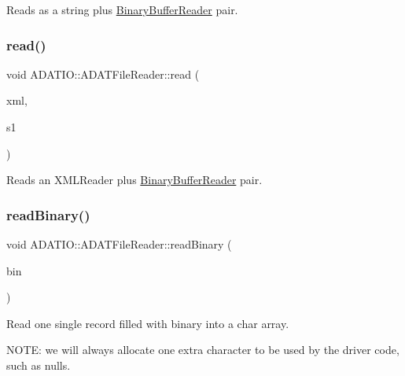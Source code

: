 Reads as a string plus \mbox{\hyperlink{classADATIO_1_1BinaryBufferReader}{Binary\+Buffer\+Reader}} pair. 

\mbox{\label{classADATIO_1_1ADATFileReader_gadf1e0b4405e14798a0610efd8774f8d0}} 
\subsubsection{\texorpdfstring{read()}{read()}\hspace{0.1cm}{\footnotesize\ttfamily [4/4]}}
{\footnotesize\ttfamily void A\+D\+A\+T\+I\+O\+::\+A\+D\+A\+T\+File\+Reader\+::read (\begin{DoxyParamCaption}\item[{\mbox{\hyperlink{classADATXML_1_1XMLReader}{X\+M\+L\+Reader}} \&}]{xml,  }\item[{\mbox{\hyperlink{classADATIO_1_1BinaryBufferReader}{Binary\+Buffer\+Reader}} \&}]{s1 }\end{DoxyParamCaption})}



Reads an X\+M\+L\+Reader plus \mbox{\hyperlink{classADATIO_1_1BinaryBufferReader}{Binary\+Buffer\+Reader}} pair. 

\mbox{\label{classADATIO_1_1ADATFileReader_ga40b41bda2b27ce68a0ac0ee28124fc64}} 
\subsubsection{\texorpdfstring{readBinary()}{readBinary()}}
{\footnotesize\ttfamily void A\+D\+A\+T\+I\+O\+::\+A\+D\+A\+T\+File\+Reader\+::read\+Binary (\begin{DoxyParamCaption}\item[{\mbox{\hyperlink{classXMLArray_1_1Array}{Array}}$<$ char $>$ \&}]{bin }\end{DoxyParamCaption})\hspace{0.3cm}{\ttfamily [protected]}}



Read one single record filled with binary into a char array. 

N\+O\+TE\+: we will always allocate one extra character to be used by the driver code, such as nulls.


